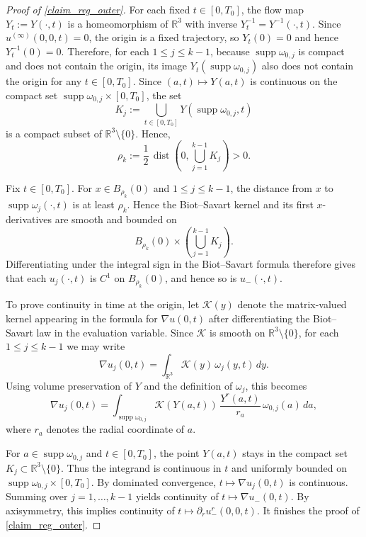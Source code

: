 \documentclass[reqno,11pt]{amsart}
\newcommand{\supp}{\operatorname{supp}}
\begin{document}
\begin{proof}[Proof of \eqref{claim_reg_outer}]

For each fixed $t\in[0,T_0]$, the flow map $Y_t:=Y(\cdot,t)$ is a homeomorphism of
$\mathbb R^3$ with inverse $Y_t^{-1}=Y^{-1}(\cdot,t)$. Since $u^{(\infty)}(0,0,t)=0$, the origin is a
fixed trajectory, so $Y_t(0)=0$ and hence $Y_t^{-1}(0)=0$. Therefore, for each $1\le j\le k-1$, because
$\supp \omega_{0,j}$ is compact and does not contain the origin, its image
$Y_t(\supp \omega_{0,j})$ also does not contain the origin for any $t\in[0,T_0]$.
Since $(a,t)\mapsto Y(a,t)$ is continuous on the compact set
$\supp \omega_{0,j}\times[0,T_0]$, the set
\[
K_j:=\bigcup_{t\in[0,T_0]}Y(\supp \omega_{0,j},t)
\]
is a compact subset of $\mathbb R^3\setminus\{0\}$.
 Hence,
\[
\rho_k:=\frac12\,\operatorname{dist}\!\left(0,\bigcup_{j=1}^{k-1}K_j\right)>0.
\]

Fix $t\in[0,T_0]$. For $x\in B_{\rho_k}(0)$ and $1\le j\le k-1$, the distance from $x$ to
$\supp\omega_j(\cdot,t)$ is at least $\rho_k$. Hence the Biot--Savart kernel and its first
$x$-derivatives are smooth and bounded on
\[
B_{\rho_k}(0)\times \left(\bigcup_{j=1}^{k-1}K_j\right).
\]
Differentiating under the integral sign in the Biot--Savart formula therefore gives that each
$u_j(\cdot,t)$ is $C^1$ on $B_{\rho_k}(0)$, and hence so is $u_-(\cdot,t)$.

To prove continuity in time at the origin, let $\mathcal{K}(y)$ denote the matrix-valued kernel
appearing in the formula for $\nabla u(0,t)$ after differentiating the Biot--Savart law in the
evaluation variable. Since $\mathcal{K}$ is smooth on $\mathbb{R}^3\setminus\{0\}$, for each
$1\le j\le k-1$ we may write
\[
\nabla u_j(0,t)=\int_{\mathbb{R}^3}\mathcal{K}(y)\,\omega_j(y,t)\,dy.
\]
Using volume preservation of $Y$ and the definition of $\omega_j$, this becomes
\[
\nabla u_j(0,t)
=
\int_{\supp\omega_{0,j}}
\mathcal{K}(Y(a,t))\,
\frac{Y^r(a,t)}{r_a}\,
\omega_{0,j}(a)\,da,
\]
where $r_a$ denotes the radial coordinate of $a$.

For $a\in\supp\omega_{0,j}$ and $t\in[0,T_0]$, the point $Y(a,t)$ stays in the compact set
$K_j\subset \mathbb{R}^3\setminus\{0\}$. Thus the integrand is continuous in $t$ and uniformly
bounded on $\supp\omega_{0,j}\times[0,T_0]$. By dominated convergence,
$t\mapsto \nabla u_j(0,t)$ is continuous. Summing over $j=1,\dots,k-1$ yields continuity of
$t\mapsto \nabla u_-(0,t)$. By axisymmetry, this implies continuity of
$t\mapsto \partial_r u_-^r(0,0,t)$. It finishes the proof of \eqref{claim_reg_outer}.
\end{proof}
\end{document}
